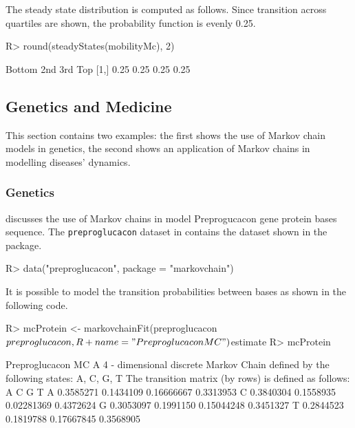 \documentclass[
  nojss]{jss}
\begin{document}
The steady state distribution is computed as follows. Since transition across quartiles are shown, the probability function is evenly 0.25.

\begin{CodeChunk}

\begin{CodeInput}
R> round(steadyStates(mobilityMc), 2)
\end{CodeInput}

\begin{CodeOutput}
     Bottom  2nd  3rd  Top
[1,]   0.25 0.25 0.25 0.25
\end{CodeOutput}
\end{CodeChunk}

\hypertarget{sec:gen}{%
\subsection{Genetics and Medicine}\label{sec:gen}}

This section contains two examples: the first shows the use of Markov chain models in genetics, the second shows an application of Markov chains in modelling diseases' dynamics.

\hypertarget{sec:genetics}{%
\subsubsection{Genetics}\label{sec:genetics}}

\cite{averyHenderson} discusses the use of Markov chains in model Preprogucacon gene protein bases sequence. The \texttt{preproglucacon} dataset in  contains the dataset shown in the package.

\begin{CodeChunk}

\begin{CodeInput}
R> data("preproglucacon", package = "markovchain")
\end{CodeInput}
\end{CodeChunk}

It is possible to model the transition probabilities between bases as shown in the following code.

\begin{CodeChunk}

\begin{CodeInput}
R> mcProtein <- markovchainFit(preproglucacon$preproglucacon, 
R+                           name = "Preproglucacon MC")$estimate
R> mcProtein
\end{CodeInput}

\begin{CodeOutput}
Preproglucacon MC 
 A  4 - dimensional discrete Markov Chain defined by the following states: 
 A, C, G, T 
 The transition matrix  (by rows)  is defined as follows: 
          A         C          G         T
A 0.3585271 0.1434109 0.16666667 0.3313953
C 0.3840304 0.1558935 0.02281369 0.4372624
G 0.3053097 0.1991150 0.15044248 0.3451327
T 0.2844523 0.1819788 0.17667845 0.3568905
\end{CodeOutput}
\end{CodeChunk}
\end{document}
